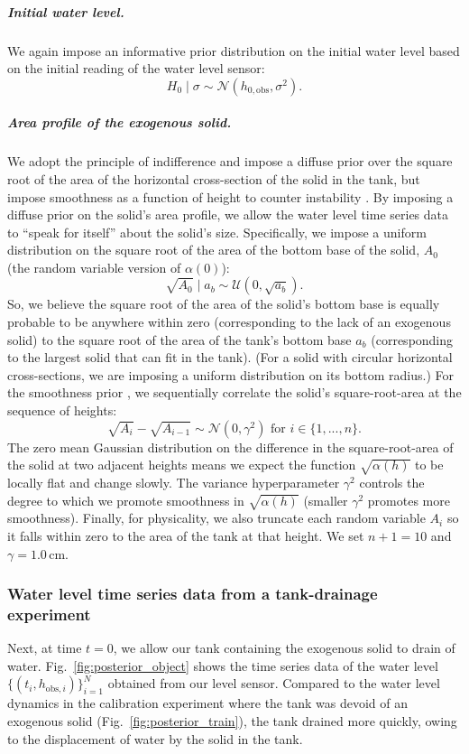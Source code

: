 \documentclass[a4paper,fleqn]{cas-dc}
\newcommand\thedata {$\{(t_i,h_{\text{obs}, i})\}_{i=1}^{N}$\xspace}
\begin{document}
\subparagraph{Initial water level.} We again impose an informative prior distribution on the initial water level based on the initial reading of the water level sensor:
\begin{equation}
	H_0 \mid \sigma \sim \mathcal{N}(h_{0, \text{obs}}, \sigma^2).
\end{equation}

\subparagraph{Area profile of the exogenous solid.}
We adopt the principle of indifference and impose a diffuse prior over the square root of the area of the horizontal cross-section of the solid in the tank, but impose smoothness as a function of height to counter instability \cite{groetsch1993inverse_tl}. 
By imposing a diffuse prior on the solid's area profile, we allow the water level time series data to ``speak for itself'' about the solid's size.
Specifically, we impose a uniform distribution on the square root of the area of the bottom base of the solid, $A_0$ (the random variable version of $\alpha(0)$):
\begin{equation}
	\sqrt{A_0} \mid a_b \sim \mathcal{U}(0, \sqrt{a_b}).
\end{equation} 
So, we believe the square root of the area of the solid's bottom base is equally probable to be anywhere within zero (corresponding to the lack of an exogenous solid) to the square root of the area of the tank's bottom base $a_b$ (corresponding to the largest solid that can fit in the tank).
(For a solid with circular horizontal cross-sections, we are imposing a uniform distribution on its bottom radius.)
For the smoothness prior \cite{calvetti2018inverse}, we sequentially correlate the solid's square-root-area at the sequence of heights: 
\begin{equation}
 \sqrt{A_i} - \sqrt{A_{i-1}} \sim \mathcal{N}(0, \gamma^2) \text{ for } i \in \{1, ..., n\}.
\end{equation} 
The zero mean Gaussian distribution on the difference in the square-root-area of the solid at two adjacent heights means we expect the function $\sqrt{\alpha(h)}$ to be locally flat and change slowly. 
The variance hyperparameter $\gamma^2$ controls the degree to which we promote smoothness in $\sqrt{\alpha (h)}$ (smaller $\gamma^2$ promotes more smoothness). 
Finally, for physicality, we also truncate each random variable $A_i$ so it falls within zero to the area of the tank at that height.
We set $n+1=10$ and $\gamma=1.0$\,cm.

\subsubsection{Water level time series data from a tank-drainage experiment}
Next, at time $t=0$, we allow our tank containing the exogenous solid to drain of water. Fig.~\ref{fig:posterior_object} shows the time series data of the water level \thedata obtained from our level sensor. Compared to the water level dynamics in the calibration experiment where the tank was devoid of an exogenous solid (Fig.~\ref{fig:posterior_train}), the tank drained more quickly, owing to the displacement of water by the solid in the tank.
\end{document}
